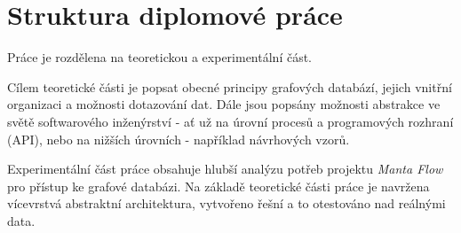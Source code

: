 \section{Struktura diplomové práce}
Práce je rozdělena na teoretickou a experimentální část.

Cílem teoretické části je popsat obecné principy grafových databází, jejich vnitřní organizaci a možnosti dotazování dat. Dále jsou popsány možnosti abstrakce ve světě softwarového inženýrství - ať už na úrovní procesů a programových rozhraní (API), nebo na nižších úrovních - například návrhových vzorů.

Experimentální část práce obsahuje hlubší analýzu potřeb projektu \textit{Manta Flow} pro přístup ke grafové databázi. Na základě teoretické části práce je navržena vícevrstvá abstraktní architektura, vytvořeno  řešní a to otestováno nad reálnými data.
